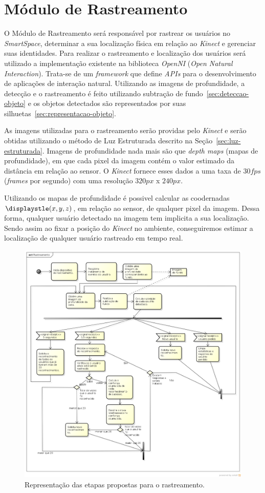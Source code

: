 \section{Módulo de Rastreamento}

	O Módulo de Rastreamento será responsável por rastrear os usuários no
	\textit{SmartSpace}, determinar a sua localização física em relação
	ao \textit{Kinect} e gerenciar suas identidades. Para realizar o rastreamento e
	localização dos usuários será utilizado a implementação existente na
	biblioteca \textit{OpenNI} (\textit{Open Natural Interaction}). Trata-se de um
	\textit{framework} que define \textit{APIs} para o desenvolvimento de
	aplicações de interação natural. Utilizando as imagens de
	profundidade, a detecção e o rastreamento é feito utilizando
	subtração de fundo~\ref{sec:deteccao-objeto} e os objetos detectados são
	representados por suas silhuetas~\ref{sec:representacao-objeto}.

	As imagens utilizadas para o rastreamento serão providas pelo \textit{Kinect} 
	e serão obtidas utilizando o método de Luz Estruturada descrito na
	Seção~\ref{sec:luz-estruturada}. Imagens de profundidade nada mais são que
	\textit{depth maps} (mapas de profundidade), em que cada pixel da imagem
	contém o valor estimado da distância em relação ao sensor. O \textit{Kinect}
	fornece esses dados a uma taxa de $\displaystyle 30 fps$ (\textit{frames} por
	segundo) com uma resolução $\displaystyle 320px$ x $\displaystyle 240px$.
	
	Utilizando os mapas de profundidade é possivel calcular as coodernadas
	$\displaystle (x,y,z)$, em relação ao sensor, de qualquer pixel da imagem.
	Dessa forma, qualquer usuário detectado na imagem tem implicita a sua
	localização. Sendo assim ao fixar a posição do \textit{Kinect} no
	ambiente, conseguiremos estimar a localização de qualquer usuário rastreado em
	tempo real.
	
	
	\begin{figure}[H]
		\begin{center}
			\includegraphics[scale=0.45]{figuras/4.ProblemaEProposta/diagrama-rastreamento.png}
		\end{center}
		\caption{Representação das etapas propostas para o rastreamento.}
		\label{fig:processo-rastreamento}
	\end{figure}
